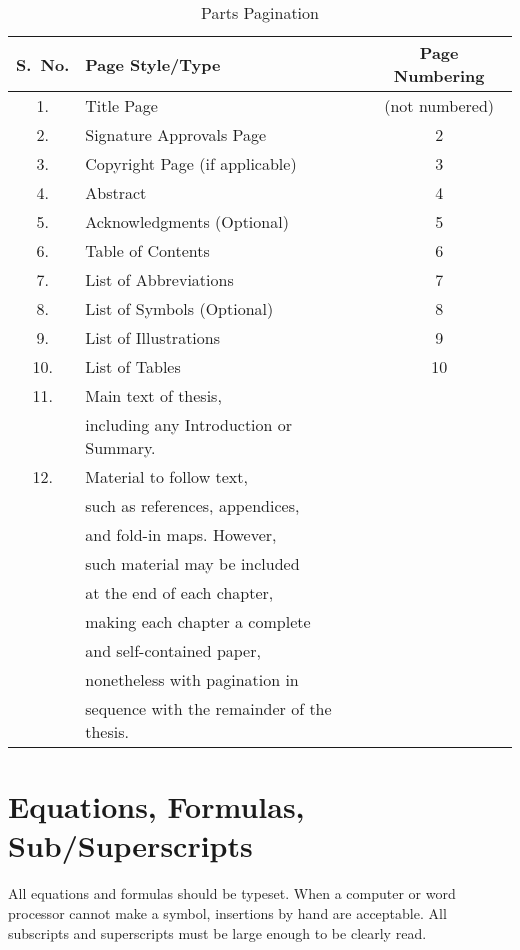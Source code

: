 \begin{table}
\centering\caption{Parts Pagination \cite{guidelines}} \label{table}
\begin{tabular}{|c|l|c|}\hline
\textbf{S.~No.} & \textbf{Page Style/Type} & \textbf{Page Numbering} \\\hline\hline
 1. & Title Page                      & (not numbered)\\ \hline
 2. & Signature Approvals Page        & 2\\ \hline
 3. & Copyright Page (if applicable)  & 3\\ \hline
 4. & Abstract                        & 4\\ \hline
 5. & Acknowledgments (Optional)      & 5\\ \hline
 6. & Table of Contents               & 6\\ \hline
 7. & List of Abbreviations           & 7\\ \hline
 8. & List of Symbols (Optional)      & 8\\ \hline
 9. & List of Illustrations           & 9\\ \hline
10. & List of Tables                  & 10\\ \hline
11. & Main text of thesis,            & \\
    & including any Introduction or Summary. & \\ \hline
12. & Material to follow text,        & \\
    & such as references, appendices, & \\
    & and fold-in maps. However,      & \\
    & such material may be included   & \\
    & at the end of each chapter,     & \\
    & making each chapter a complete  & \\
    & and self-contained paper,       & \\
    & nonetheless with pagination in  & \\
    & sequence with the remainder of the thesis. & \\ \hline
\end{tabular}
\end{table}

\section{Equations, Formulas, Sub/Superscripts}

All equations and formulas should be typeset. When a computer or word processor cannot make a symbol, insertions by hand are acceptable. All subscripts and superscripts must be large enough to be clearly read.

